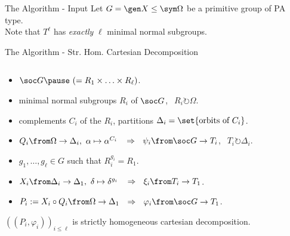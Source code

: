 \begin{frame}{The Algorithm - Input}
    \centering
    \large
    Let $G = \gen X \leq \sym \Omega$ be a primitive group of PA type.
    \\[1em]
    \pause
    Note that $T ^ \ell$ has \emph{exactly} $\ell$ minimal normal subgroups.
\end{frame}


\begin{frame}{The Algorithm - Str. Hom. Cartesian Decomposition}
    \begin{alg}
        $~$
        \\[-1em]
        \begin{itemize}
            \item
            $\soc G \pause ~ (= R_1 \times \ldots \times R_\ell)$.
            \pause
            \item
            minimal normal subgroups $R_i$ of $\soc G$,
            $~~R_i \circlearrowright \Omega$.
            \pause
            \item
            complements $C_i$ of the $R_i$,
            \pause
            partitions $\Delta_i = \set{ \text{orbits of } C_i }$.
            \pause
            \item
            $Q_i \from \Omega \to \Delta_i,
            ~ \alpha \mapsto \alpha ^ {C_i}$
            \pause
            $~~\Rightarrow~~ \psi_i \from \soc G \to T_i$,
            $~~T_i \circlearrowright \Delta_i$.
            \pause
            \item
            $g_1, \ldots, g_\ell \in G$ such that $R_i ^ {g_i} = R_1$.
            \pause
            \item
            $X_i \from \Delta_i \to \Delta_1,
            ~ \delta \mapsto \delta ^ {g_i}$
            \pause
            $~~\Rightarrow~~ \xi_i \from T_i \to T_1$.
            \pause
            \item
            $P_i := X_i \circ Q_i \from \Omega \to \Delta_1$
            \pause
            $\hspace{0.5em}\Rightarrow~~ \varphi_i \from \soc G \to T_1$.
        \end{itemize}
    \end{alg}
    \pause

    $((P_i, \varphi_i))_{i \leq \ell}$
    is strictly homogeneous cartesian decomposition.
\end{frame}

